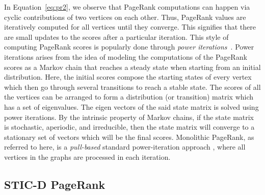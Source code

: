 In Equation~\ref{eq:pr2}, we observe that PageRank computations can happen via cyclic contributions of two vertices on each other. Thus, PageRank values are iteratively computed for all vertices until they converge. This signifies that there are small updates to the scores after a particular iteration. This style of computing PageRank scores is popularly done through \emph{power iterations}~\cite{page}. Power iterations arises from the idea of modeling the computations of the PageRank scores as a Markov chain that reaches a steady state when starting from an initial distribution. Here, the initial scores compose the starting states of every vertex which then go through several transitions to reach a stable state. The scores of all the vertices can be arranged to form a distribution (or transition) matrix which has a set of eigenvalues. The eigen vectors of the said state matrix is solved using power iterations. By the intrinsic property of Markov chains, if the state matrix is stochastic, aperiodic, and irreducible, then the state matrix will converge to a stationary set of vectors which will be the final scores. Monolithic PageRank, as referred to here, is a \emph{pull-based} standard power-iteration approach \cite{pr-whang15}, where all vertices in the graphs are processed in each iteration.






\subsection{STIC-D PageRank}

